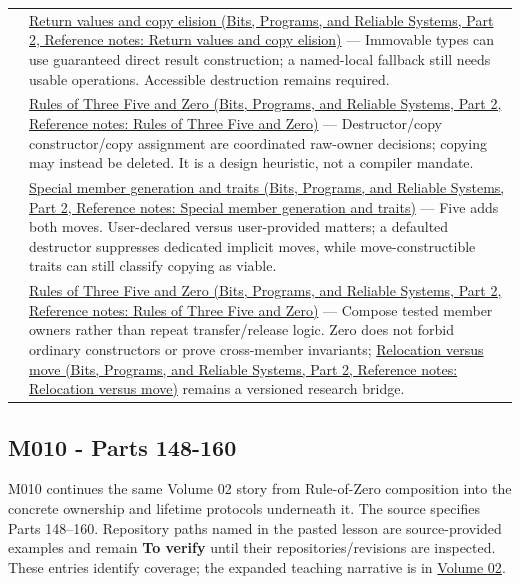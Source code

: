 {\begin{longtable}[]{@{}
  >{\raggedright\arraybackslash}p{}
  >{\raggedright\arraybackslash}p{}@{}}
144 & \href{../01-Bits-Programs-and-Reliable-Systems-P02/main.pdf\#appendix-b08d3788c5c6}{Return values and copy elision (Bits, Programs, and Reliable Systems, Part 2, Reference notes: Return values and copy elision)} --- Immovable types can use guaranteed direct result construction; a named-local fallback still needs usable operations. Accessible destruction remains required. \\
145 & \href{../01-Bits-Programs-and-Reliable-Systems-P02/main.pdf\#appendix-7679107d057e}{Rules of Three Five and Zero (Bits, Programs, and Reliable Systems, Part 2, Reference notes: Rules of Three Five and Zero)} --- Destructor/copy constructor/copy assignment are coordinated raw-owner decisions; copying may instead be deleted. It is a design heuristic, not a compiler mandate. \\
146 & \href{../01-Bits-Programs-and-Reliable-Systems-P02/main.pdf\#appendix-42e02a12c694}{Special member generation and traits (Bits, Programs, and Reliable Systems, Part 2, Reference notes: Special member generation and traits)} --- Five adds both moves. User-declared versus user-provided matters; a defaulted destructor suppresses dedicated implicit moves, while move-constructible traits can still classify copying as viable. \\
147 & \href{../01-Bits-Programs-and-Reliable-Systems-P02/main.pdf\#appendix-7679107d057e}{Rules of Three Five and Zero (Bits, Programs, and Reliable Systems, Part 2, Reference notes: Rules of Three Five and Zero)} --- Compose tested member owners rather than repeat transfer/release logic. Zero does not forbid ordinary constructors or prove cross-member invariants; \href{../01-Bits-Programs-and-Reliable-Systems-P02/main.pdf\#appendix-adfd6397af8d}{Relocation versus move (Bits, Programs, and Reliable Systems, Part 2, Reference notes: Relocation versus move)} remains a versioned research bridge. \\
\end{longtable}
}

\subsection{M010 - Parts 148-160}\label{appendix-fd090d982a15-m010---parts-148-160}

\hypertarget{appendix-fd090d982a15-m010---parts-148-160}{}

M010 continues the same Volume 02 story from Rule-of-Zero composition into the concrete ownership and lifetime protocols underneath it. The source specifies Parts 148--160. Repository paths named in the pasted lesson are source-provided examples and remain \textbf{To verify} until their repositories/revisions are inspected. These entries identify coverage; the expanded teaching narrative is in \hyperref[01-foundations-i-ch004-from-a-live-object-to-responsible-resource-ownership]{Volume 02}.

